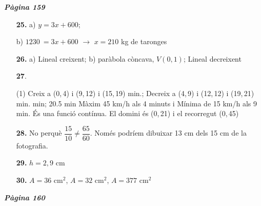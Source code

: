 \documentclass[a4paper, pdf, twoside]{book}
\begin{document}
\begin{multicols}{2}
{\textbf{\em Pàgina 159}} \hrulefill
\begin{enumerate}
\vspace{0.25cm}
\item[\fontfamily{phv}\selectfont\color{blue}\textbf{25. }]  \scalebox{0.6}{\simbolclau } 
 a) $y=3x+600$; \par b) $\mathrm {1230}\mathrm {\ }=3x+600$ $\rightarrow $ $x=210$ kg de taronges
 \end{enumerate}
\begin{enumerate}
\vspace{0.25cm}
\item[\fontfamily{phv}\selectfont\color{blue}\textbf{26. }]  \scalebox{0.6}{\simbolclau } 
 a) Lineal creixent; \quad b) paràbola còncava, $V(0,1)$; \quad Lineal decreixent
\vspace{0.25cm}



 \item[\fontfamily{phv}\selectfont\color{blue}\textbf{27}. ]  \scalebox{0.6}{\simbolclau } 
 \begin{tasks}[column-sep=1em, item-indent=1.3333em](1)
	 \task* Creix a (0,\,4) i (9,\,12) i (15,\,19) min.; Decreix a (4,\,9) i (12,\,12) i (19,\,21) min.
	  min; 20.5 min
	 \task* Màxim 45 km/h als 4 minuts i Mínima de 15 km/h als 9 min.
	 \task* És una funció contínua. El domini és (0,\,21) i el recorregut (0,\,45) 
\end{tasks}
\vspace{0.25cm}
\item[\fontfamily{phv}\selectfont\color{blue}\textbf{28. }]  \scalebox{0.6}{\simbolclau } 
No perquè $\dfrac {15}{10} \neq \dfrac { 65}{60}$. Només podríem dibuixar 13 cm dels 15 cm de la fotografia.
\vspace{0.25cm}
\item[\fontfamily{phv}\selectfont\color{blue}\textbf{29. }]  \scalebox{0.6}{\simbolclau } 
$h=2,9$ cm
\vspace{0.25cm}
\item[\fontfamily{phv}\selectfont\color{blue}\textbf{30. }]  \scalebox{0.6}{\simbolclau } 
$A=36$ cm$^2$, $A=32$ cm$^2$, $A=377$ cm$^2$
 \end{enumerate}
\vspace{0.3cm}


{\textbf{\em Pàgina 160}} \hrulefill
\begin{enumerate}
\vspace{0.25cm}



\end{enumerate}
\end{multicols}
\end{document}
